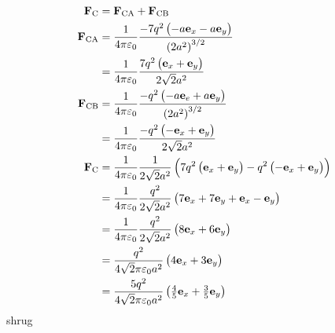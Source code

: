 \begin{align*}
    \mathbf{F}_{\textrm{C}} & = \mathbf{F}_{\textrm{CA}} + \mathbf{F}_{\textrm{CB}}\\
    \mathbf{F}_{\textrm{CA}} & = \frac{1}{4 \pi \varepsilon_0} \frac{-7q^2 \del{-a \mathbf{e}_x - a \mathbf{e}_y}}{\del{2a^2}^{3/2}}\\
    & = \frac{1}{4 \pi \varepsilon_0} \frac{7q^2 \del{\mathbf{e}_x + \mathbf{e}_y}}{2 \sqrt{2} a^2}\\
    \mathbf{F}_{\textrm{CB}} & = \frac{1}{4 \pi \varepsilon_0} \frac{-q^2 \del{-a \mathbf{e}_e + a \mathbf{e}_y}}{\del{2a^2}^{3/2}}\\
    & = \frac{1}{4 \pi \varepsilon_0} \frac{-q^2 \del{- \mathbf{e}_x + \mathbf{e}_y}}{2 \sqrt{2} a^2}\\
    \mathbf{F}_{\textrm{C}} & = \frac{1}{4 \pi \varepsilon_0} \frac{1}{2 \sqrt{2} a^2} \del{7q^2 \del{\mathbf{e}_x + \mathbf{e}_y} - q^2 \del{- \mathbf{e}_x + \mathbf{e}_y}}\\
    & = \frac{1}{4 \pi \varepsilon_0} \frac{q^2}{2 \sqrt{2} a^2} \del{7 \mathbf{e}_x + 7 \mathbf{e}_y + \mathbf{e}_x - \mathbf{e}_y}\\
    & = \frac{1}{4 \pi \varepsilon_0} \frac{q^2}{2 \sqrt{2} a^2} \del{8 \mathbf{e}_x + 6 \mathbf{e}_y}\\
    & = \frac{q^2}{4 \sqrt{2} \pi \varepsilon_0 a^2} \del{4 \mathbf{e}_x + 3 \mathbf{e}_y}\\
    & = \frac{5q^2}{4 \sqrt{2} \pi \varepsilon_0 a^2} \del{\tfrac{4}{5} \mathbf{e}_x + \tfrac{3}{5} \mathbf{e}_y}
\end{align*}
shrug
